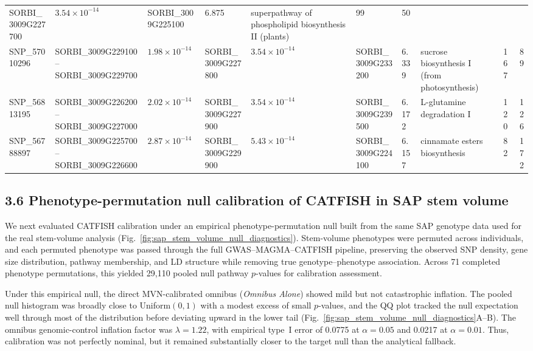 \documentclass[unnumsec,webpdf,contemporary,large]{oup-authoring-template}%
\theoremstyle{thmstyleone}%
\theoremstyle{thmstyletwo}%
\theoremstyle{thmstylethree}%
\begin{document}
\begin{table}[ht]
\begin{tabular}{p{} p{} p{} p{} p{} p{} p{} p{} rr}
SORBI\_3009G227700 & $3.54\times10^{-14}$ &
SORBI\_3009G225100 & 6.875 & superpathway of phospholipid biosynthesis II (plants) & 99 & 50 \\
SNP\_57010296 & SORBI\_3009G229100--SORBI\_3009G229700 & $1.98\times10^{-14}$ &
SORBI\_3009G227800 & $3.54\times10^{-14}$ &
SORBI\_3009G233200 & 6.339 & sucrose biosynthesis I (from photosynthesis) & 167 & 89 \\
SNP\_56813195 & SORBI\_3009G226200--SORBI\_3009G227000 & $2.02\times10^{-14}$ &
SORBI\_3009G227900 & $3.54\times10^{-14}$ &
SORBI\_3009G239500 & 6.172 & L-glutamine degradation I & 120 & 126 \\
SNP\_56788897 & SORBI\_3009G225700--SORBI\_3009G226600 & $2.87\times10^{-14}$ &
SORBI\_3009G229900 & $5.43\times10^{-14}$ &
SORBI\_3009G224100 & 6.157 & cinnamate esters biosynthesis & 82 & 172 \\
\hline
\end{tabular}
\end{table}


\subsection{3.6 Phenotype-permutation null calibration of CATFISH in SAP stem volume}

We next evaluated CATFISH calibration under an empirical phenotype-permutation null built from the same SAP genotype data used for the real stem-volume analysis (Fig.~\ref{fig:sap_stem_volume_null_diagnostics}). Stem-volume phenotypes were permuted across individuals, and each permuted phenotype was passed through the full GWAS--MAGMA--CATFISH pipeline, preserving the observed SNP density, gene size distribution, pathway membership, and LD structure while removing true genotype--phenotype association. Across 71 completed phenotype permutations, this yielded 29{,}110 pooled null pathway $p$-values for calibration assessment.

Under this empirical null, the direct MVN-calibrated omnibus (\emph{Omnibus Alone}) showed mild but not catastrophic inflation. The pooled null histogram was broadly close to Uniform$(0,1)$ with a modest excess of small $p$-values, and the QQ plot tracked the null expectation well through most of the distribution before deviating upward in the lower tail (Fig.~\ref{fig:sap_stem_volume_null_diagnostics}A--B). The omnibus genomic-control inflation factor was \(\lambda = 1.22\), with empirical type~I error of 0.0775 at \(\alpha=0.05\) and 0.0217 at \(\alpha=0.01\). Thus, calibration was not perfectly nominal, but it remained substantially closer to the target null than the analytical fallback.
\end{document}

